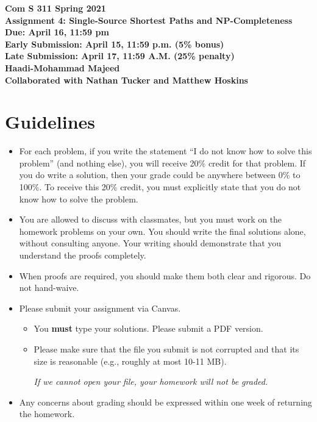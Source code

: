 \documentclass[12pt]{article}
\begin{document}
\pagestyle{plain}

\begin{center}
{\bf Com S 311 Spring 2021 \\}
{\Large \bf Assignment 4: Single-Source Shortest Paths and NP-Completeness \\}
{\bf Due: April 16, 11:59 pm \\}
{\bf Early Submission: April 15, 11:59 p.m. (5\% bonus) \\}
{\bf Late Submission: April 17, 11:59 A.M. (25\% penalty) }
\textbf{\\Haadi-Mohammad Majeed\\Collaborated with Nathan Tucker and Matthew Hoskins} 

\end{center}

\section*{\large Guidelines}

\begin{itemize}

\item %
For each problem, if you write  the statement ``I do not know how to solve this problem'' (and nothing else), you will receive 20\% credit for that problem. If you do write a solution, then your grade could be anywhere between 0\% to 100\%.
To receive this 20\% credit, you must explicitly state that you do not know how to solve the problem.

\item You are allowed to discuss with classmates, but you must work on the homework problems on your own.  You should write the final solutions alone, without consulting anyone. Your writing should demonstrate that you understand the proofs completely.

\item When proofs are required, you should make them both clear and rigorous. Do not hand-waive.

 \item Please submit your assignment via Canvas.
 \begin{itemize}
\item  You \textbf{must} type your solutions. Please submit a PDF version.
\item Please make sure that the file you submit is not corrupted and that its size is reasonable (e.g., roughly at most 10-11 MB).
\begin{center}
\emph{If we cannot open your file, your homework will not be graded.}
\end{center}
\end{itemize}

\item Any concerns about grading should be expressed within one week of
returning the homework.

\end{itemize}
\newpage
\end{document}
